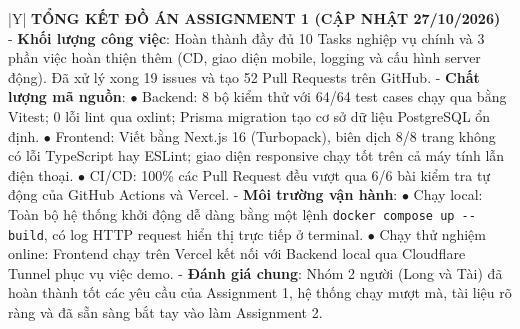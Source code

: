 \documentclass[12pt, a4paper]{article}
\begin{document}
\begin{tabularx}{\textwidth}{|Y|}
    \hline
    \textbf{TỔNG KẾT ĐỒ ÁN ASSIGNMENT 1 (CẬP NHẬT 27/10/2026)} \\
    \hline
    - \textbf{Khối lượng công việc}: Hoàn thành đầy đủ 10 Tasks nghiệp vụ chính và 3 phần việc hoàn thiện thêm (CD, giao diện mobile, logging và cấu hình server động). Đã xử lý xong 19 issues và tạo 52 Pull Requests trên GitHub. \newline
    - \textbf{Chất lượng mã nguồn}: \newline
    \quad $\bullet$ Backend: 8 bộ kiểm thử với 64/64 test cases chạy qua bằng Vitest; 0 lỗi lint qua oxlint; Prisma migration tạo cơ sở dữ liệu PostgreSQL ổn định. \newline
    \quad $\bullet$ Frontend: Viết bằng Next.js 16 (Turbopack), biên dịch 8/8 trang không có lỗi TypeScript hay ESLint; giao diện responsive chạy tốt trên cả máy tính lẫn điện thoại. \newline
    \quad $\bullet$ CI/CD: 100\% các Pull Request đều vượt qua 6/6 bài kiểm tra tự động của GitHub Actions và Vercel. \newline
    - \textbf{Môi trường vận hành}: \newline
    \quad $\bullet$ Chạy local: Toàn bộ hệ thống khởi động dễ dàng bằng một lệnh \texttt{docker compose up -{}-build}, có log HTTP request hiển thị trực tiếp ở terminal. \newline
    \quad $\bullet$ Chạy thử nghiệm online: Frontend chạy trên Vercel kết nối với Backend local qua Cloudflare Tunnel phục vụ việc demo. \newline
    - \textbf{Đánh giá chung}: Nhóm 2 người (Long và Tài) đã hoàn thành tốt các yêu cầu của Assignment 1, hệ thống chạy mượt mà, tài liệu rõ ràng và đã sẵn sàng bắt tay vào làm Assignment 2. \\
    \hline
\end{tabularx}
\end{document}
